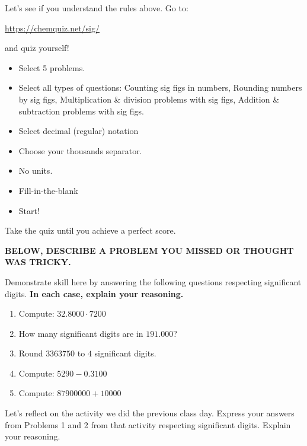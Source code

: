 \documentclass[handout,noauthor,nooutcomes,hints,12pt]{ximera}
\begin{document}
\begin{question}
  Let's see if you understand the rules above. Go to:
\begin{center}
  \url{https://chemquiz.net/sig/}
\end{center}
and quiz yourself!
\begin{itemize}
  \item Select 5 problems.
  \item Select all types of questions: Counting sig figs in numbers, Rounding numbers by sig figs, Multiplication \& division problems with sig figs, Addition \& subtraction problems with sig figs.
  \item Select decimal (regular) notation
  \item Choose your thousands separator.
  \item No units. 
  \item Fill-in-the-blank
  \item Start!
\end{itemize}
Take the quiz until you achieve a perfect score. 

\textbf{BELOW, DESCRIBE A PROBLEM YOU MISSED OR THOUGHT WAS TRICKY.} 
\end{question}
\mynewpage

\begin{question}
Demonstrate skill here by answering the following questions respecting significant digits. \textbf{In each case, explain your reasoning.}
\begin{enumerate}
  \item Compute: $32.8000 \cdot 7200$
  \vfill

  \item How many significant digits are in $191.000$?

  \vfill 
  \item Round  $3363750$ to $4$ significant digits.
  \vfill

  \item Compute:  $5290 - 0.3100$
  \vfill
  \item Compute: $87 900 000 + 10 000$
\vfill
\end{enumerate}


\end{question}
\mynewpage

\begin{question}
Let's reflect on the activity we did the previous class day. Express your answers from Problems 1 and 2 from that activity 
respecting significant digits. Explain your reasoning. 
\end{question}
\end{document}
